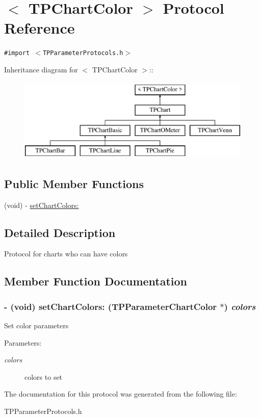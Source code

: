 \hypertarget{protocol_t_p_chart_color-p}{
\section{$<$ TPChartColor $>$ Protocol Reference}
\label{protocol_t_p_chart_color-p}
}
{\tt \#import $<$TPParameterProtocols.h$>$}

Inheritance diagram for $<$ TPChartColor $>$::\begin{figure}[H]
\begin{center}
\leavevmode
\includegraphics[height=4cm]{protocol_t_p_chart_color-p}
\end{center}
\end{figure}
\subsection*{Public Member Functions}
\begin{CompactItemize}
\item 
(void) - \hyperlink{protocol_t_p_chart_color-p_cce9d732cc3fd7f56a1e14fb73e8a1cb}{setChartColors:}
\end{CompactItemize}


\subsection{Detailed Description}
Protocol for charts who can have colors 

\subsection{Member Function Documentation}
\hypertarget{protocol_t_p_chart_color-p_cce9d732cc3fd7f56a1e14fb73e8a1cb}{
\subsubsection[{setChartColors:}]{\setlength{\rightskip}{0pt plus 5cm}- (void) setChartColors: ({\bf TPParameterChartColor} $\ast$) {\em colors}}}
\label{protocol_t_p_chart_color-p_cce9d732cc3fd7f56a1e14fb73e8a1cb}


Set color parameters \begin{Desc}
\item[Parameters:]
\begin{description}
\item[{\em colors}]colors to set \end{description}
\end{Desc}


The documentation for this protocol was generated from the following file:\begin{CompactItemize}
\item 
TPParameterProtocols.h\end{CompactItemize}
